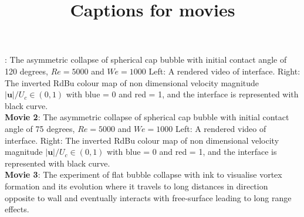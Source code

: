 \documentclass{article}
\title{Captions for movies}
\date{\vspace{-5ex}}
\begin{document}
\maketitle

: The asymmetric collapse of spherical cap bubble with initial contact angle of 120 degrees, $Re = 5000$ and $We = 1000$ Left: A rendered video of interface. Right: The inverted RdBu colour map of non dimensional velocity magnitude $|\mathbf{u}|/U_c \in (0,1)$ with blue = 0 and red = 1, and the interface is represented with black curve.\\
{\bf Movie 2}: The asymmetric collapse of spherical cap bubble with initial contact angle of 75 degrees, $Re = 5000$ and $We = 1000$ Left: A rendered video of interface. Right: The inverted RdBu colour map of non dimensional velocity magnitude $|\mathbf{u}|/U_c \in (0,1)$ with blue = 0 and red = 1, and the interface is represented with black curve.\\
{\bf Movie 3}: The experiment of flat bubble collapse with ink to visualise vortex formation and its evolution where it travels to long distances in direction opposite to wall and eventually interacts with free-surface leading to long range effects.
\end{document}
